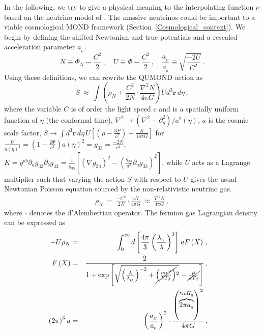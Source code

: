\documentclass[fleqn,usenatbib,useAMS]{mnras} %
\begin{document}

In the following, we try to give a physical meaning to the interpolating function $\nu$ based on the neutrino model of \citet{Zhao_2008_neutrinos}. The massive neutrinos could be important to a viable cosmological MOND framework (Section~\ref{Cosmological_context}). We begin by defining the shifted Newtonian and true potentials and a rescaled acceleration parameter $a_{_U}$.
\begin{equation}
    N \equiv \Phi_N - \frac{C^2}{2} \, , \quad U \equiv \Phi - \frac{C^2}{2} \, , \quad \frac{a_{_U}}{a_{_0}} \equiv \sqrt{\frac{-2U}{C^2}} \, .
\end{equation}
Using these definitions, we can rewrite the QUMOND action as
\begin{equation}
    S ~\approx~ \int \left(\rho_{N} + \frac{C^2}{2N} \cdot \frac{\nabla^2 N}{4\mathrm{\pi}G} \right) U d^3 \bm{r} \, d\eta \, ,   \label{actionnonrel}
\end{equation}
where the variable $C$ is of order the light speed $c$ and is a spatially uniform function of $\eta$ (the conformal time), $\nabla^2 \rightarrow \left( \nabla^2 - \partial^2_\eta \right)/ a^2 \left( \eta \right)$, $a$ is the cosmic scale factor, $S \rightarrow \int  d^3\bm{r} \, d\eta \, U \left[ \left( \rho -\frac{3P}{c^2} \right) + \frac{K}{16\mathrm{\pi} G} \right]$ for $\frac{U}{a \left( \eta \right)^2} = \left( 1 - \frac{2\Phi}{c^2} \right) a\left( \eta \right)^2=g_{33} = \frac{-2 N}{c^2}$, $K=g^{ab} \partial_a g_{33} \partial_b g_{33} = \frac{1}{g_{33}} \left[\left(\nabla g_{33}\right)^2  -\left(\frac{g_{33}}{a^2}\partial_\eta g_{33}\right)^2 \right]$, while $U$ acts as a Lagrange multiplier such that varying the action $S$ with respect to $U$ gives the usual Newtonian Poisson equation sourced by the non-relativistic neutrino gas.
\begin{eqnarray}
    \rho_{N} ~=~ \frac{-C^2}{2N} \cdot \frac{\square N}{4\mathrm{\pi}G} ~\approx~ \frac{\nabla^2 N}{4 \mathrm{\pi}G} \, ,
    \label{Poiss}
\end{eqnarray}
where $\square$ denotes the d'Alembertian operator. The fermion gas Lagrangian density can be expressed as
\begin{eqnarray}
    \label{Energy_density_neutrinos}
    \!\!\!\!\!\!\! -U\rho_{N} &=& \int^\infty_0 d\left[\frac{  4 \mathrm{\pi}}{3}  \left(\frac{\lambda_{_U}}{\lambda}\right)^3 \right] u F\left( X \right) \, , \\
    \!\!\!\!\!\!\! F\left( X \right) &=& \frac{2}{1 + \exp\left[\sqrt{\left( \frac{\lambda}{\lambda_{_U}} \right)^{-2} + \cancel{\left(\frac{mc^2}{kT_d}\right)}^2} - \cancel{\frac{\mu}{kT_d}} \right]} \, , \\
    \!\!\!\!\!\!\! \left( 2\mathrm{\pi} \right)^3 u &=& \left( \frac{a_{_U}}{a_{_0}} \right)^2 \cdot \frac{\left(\overbrace{2 \mathrm{\pi} a_{_0}}^{\approx c H_{_0}}\right)^2}{4\mathrm{\pi} G} \, ,
\end{eqnarray}
\end{document}

